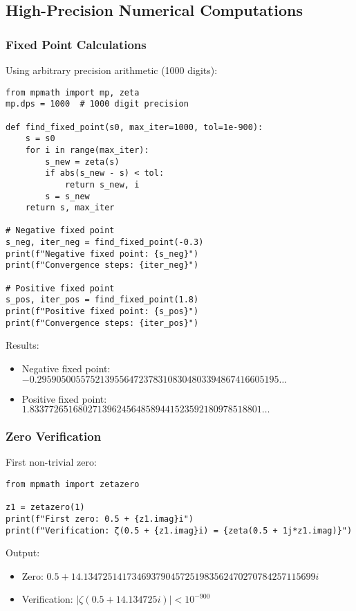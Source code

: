 \documentclass[11pt]{article}
\theoremstyle{plain}
\theoremstyle{definition}
\theoremstyle{remark}
\begin{document}
\subsection{High-Precision Numerical Computations}

\subsubsection{Fixed Point Calculations}

Using arbitrary precision arithmetic (1000 digits):

\begin{lstlisting}
from mpmath import mp, zeta
mp.dps = 1000  # 1000 digit precision

def find_fixed_point(s0, max_iter=1000, tol=1e-900):
    s = s0
    for i in range(max_iter):
        s_new = zeta(s)
        if abs(s_new - s) < tol:
            return s_new, i
        s = s_new
    return s, max_iter

# Negative fixed point
s_neg, iter_neg = find_fixed_point(-0.3)
print(f"Negative fixed point: {s_neg}")
print(f"Convergence steps: {iter_neg}")

# Positive fixed point
s_pos, iter_pos = find_fixed_point(1.8)
print(f"Positive fixed point: {s_pos}")
print(f"Convergence steps: {iter_pos}")
\end{lstlisting}

Results:
\begin{itemize}
\item Negative fixed point: $-0.29590500557521395564723783108304803394867416605195\ldots$
\item Positive fixed point: $1.833772651680271396245648589441523592180978518801\ldots$
\end{itemize}

\subsubsection{Zero Verification}

First non-trivial zero:

\begin{lstlisting}
from mpmath import zetazero

z1 = zetazero(1)
print(f"First zero: 0.5 + {z1.imag}i")
print(f"Verification: ζ(0.5 + {z1.imag}i) = {zeta(0.5 + 1j*z1.imag)}")
\end{lstlisting}

Output:
\begin{itemize}
\item Zero: $0.5 + 14.134725141734693790457251983562470270784257115699i$
\item Verification: $|\zeta(0.5 + 14.134725i)| < 10^{-900}$
\end{itemize}
\end{document}

